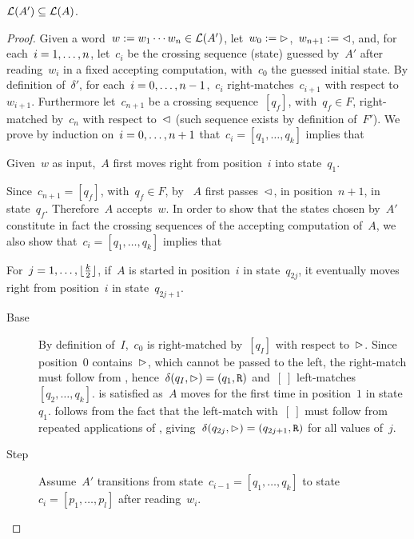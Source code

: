 \begin{lemm}\label{lem:2DFAto1NFA-2}
	$\mathcal L(A')\subseteq\mathcal L(A)$.
\end{lemm}
\begin{proof}
	Given a word~$w:=w_1\cdots w_n\in\mathcal L(A')$, let~$w_0:=\rhd$,~$w_{n+1}:=\lhd$, and, for each~$i=1,\dots,n$, let~$c_i$ be the crossing sequence (state) guessed by~$A'$ after reading~$w_i$ in a fixed accepting computation, with~$c_0$ the guessed initial state.
	By definition of~$\delta'$, for each~$i=0,\dots,n-1$,~$c_i$ right-matches~$c_{i+1}$ with respect to~$w_{i+1}$.
	Furthermore let~$c_{n+1}$ be a crossing sequence~$[q_f]$, with~$q_f\in F$, right-matched by~$c_n$ with respect to~$\lhd$ (such sequence exists by definition of~$F'$).
	We prove by induction on~$i=0,\dots,n+1$ that~$c_i=[q_1,\dots,q_k]$ implies that
	\begin{statements}
		\item \label{lem:2DFAto1NFA-2-1} Given~$w$ as input,~$A$ first moves right from position~$i$ into state~$q_1$.
	\end{statements}
	Since~$c_{n+1}=[q_f]$, with~$q_f\in F$, by ~$A$ first passes~$\lhd$, in position~$n+1$, in state~$q_f$. Therefore~$A$ accepts~$w$.
	In order to show that the states chosen by~$A'$ constitute in fact the crossing sequences of the accepting computation of~$A$, we also show that~$c_i=[q_1,\dots,q_k]$ implies that
	\begin{statements}[resume]
		\item \label{lem:2DFAto1NFA-2-2} For~$j=1,\dots,\lfloor \frac{k}{2} \rfloor$, if~$A$ is started in position~$i$ in state~$q_{2j}$, it eventually moves right from position~$i$ in state~$q_{2j+1}$.
	\end{statements}
	\begin{description}
		\item[Base] By definition of~$I$,~$c_0$ is right-matched by~$[q_I]$ with respect to~$\rhd$. Since position~$0$ contains~$\rhd$, which cannot be passed to the left, the right-match must follow from , hence~$\delta(q_I,\rhd)=(q_1,\mathtt R)$ and~$[~]$ left-matches~$[q_2,\dots,q_k]$.
		       is satisfied as~$A$ moves for the first time in position~$1$ in state~$q_1$.
		       follows from the fact that the left-match with~$[~]$ must follow from repeated applications of , giving~$\delta(q_{2j},\rhd)=(q_{2j+1},\mathtt R)$ for all values of~$j$.
		\item[Step] Assume~$A'$ transitions from state~$c_{i-1}=[q_1,\dots,q_k]$ to state~$c_i=[p_1,\dots,p_l]$ after reading~$w_i$.

\end{description}
\end{proof}
